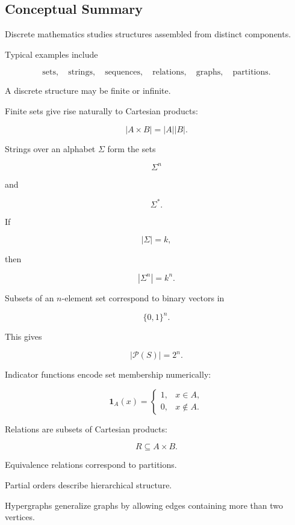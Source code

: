 \subsection{Conceptual Summary}
\label{subsec:discrete-structures-summary}

Discrete mathematics studies structures assembled from distinct
components.

Typical examples include

\[
\boxed{
\text{sets},
\quad
\text{strings},
\quad
\text{sequences},
\quad
\text{relations},
\quad
\text{graphs},
\quad
\text{partitions}.
}
\]

A discrete structure may be finite or infinite.

Finite sets give rise naturally to Cartesian products:

\[
\boxed{
|A\times B|
=
|A||B|.
}
\]

Strings over an alphabet \(\Sigma\) form the sets

\[
\Sigma^n
\]

and

\[
\Sigma^{*}.
\]

If

\[
|\Sigma|=k,
\]

then

\[
\boxed{
|\Sigma^n|=k^n.
}
\]

Subsets of an \(n\)-element set correspond to binary vectors in

\[
\boxed{
\{0,1\}^n.
}
\]

This gives

\[
\boxed{
|\mathcal{P}(S)|=2^n.
}
\]

Indicator functions encode set membership numerically:

\[
\boxed{
\mathbf{1}_A(x)
=
\begin{cases}
1,&x\in A,\\
0,&x\notin A.
\end{cases}
}
\]

Relations are subsets of Cartesian products:

\[
\boxed{
R\subseteq A\times B.
}
\]

Equivalence relations correspond to partitions.

Partial orders describe hierarchical structure.

Hypergraphs generalize graphs by allowing edges containing more than
two vertices.

